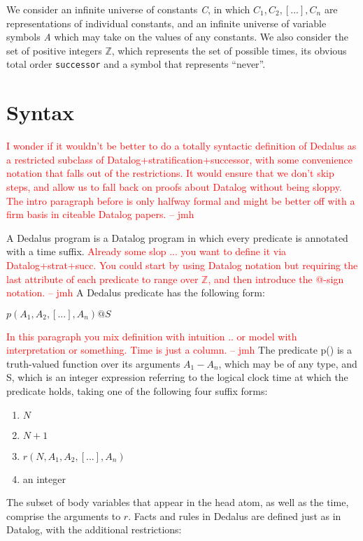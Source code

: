 \documentclass{acm_proc_article-sp-sigmod09}
\newcommand{\jmh}[1]{{\textcolor{red}{#1 -- jmh}}}
\newcommand{\dedalus}[1]{\texttt{\fontsize{9pt}{9pt}\selectfont #1}}
\begin{document}
We consider an infinite universe of constants \emph{C}, in which
$C_{1}, C_{2}, [...], C_{n}$ are representations of individual constants, and
an infinite universe of variable symbols \emph{A} which may take on the values
of any constants.   We also consider the set of positive integers $\mathbb{Z}$,
which represents the set of possible times, its obvious total order
\dedalus{successor} and a symbol that represents ``never''.

\section{Syntax}
\jmh{I wonder if it wouldn't be better to do a totally syntactic definition of Dedalus as a restricted subclass of Datalog+stratification+successor, with some convenience notation that falls out of the restrictions.  It would ensure that we don't skip steps, and allow us to fall back on proofs about Datalog without being sloppy.  The intro paragraph before is only halfway formal and might be better off with a firm basis in citeable Datalog papers.}

A Dedalus program is a Datalog program in which every predicate is annotated with a time suffix.  \jmh{Already some slop ... you want to define it via Datalog+strat+succ.  You could start by using Datalog notation but requiring the last attribute of each predicate to range over $\mathbb{Z}$, and then introduce the @-sign notation.}  A Dedalus predicate has the following form:

$p(A_{1}, A_{2}, [...], A_{n})@S$

\jmh{In this paragraph you mix definition with intuition .. or model with interpretation or something.  Time is just a column.}
The predicate p() is a truth-valued function over its arguments $A_{1} - A_{n}$, which may be of any type, and S, which is an integer expression 
referring to the logical clock time at which the predicate holds, taking one of the following four suffix forms:

\begin{enumerate}
\item $N$
\item $N + 1$
\item $r(N, A_{1}, A_{2}, [...], A_{n})$
\item an integer
\end{enumerate}

The subset of body variables that appear in the head atom, as well as the time,
comprise the arguments to $r$.  Facts and rules in Dedalus are 
defined just as in Datalog, with the additional restrictions:
\end{document}
